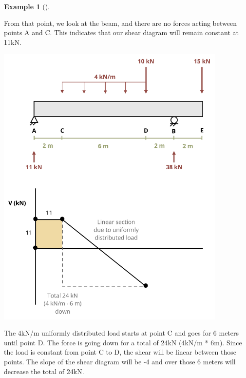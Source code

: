 \documentclass[
  letterpaper,
  DIV=11,
  numbers=noendperiod]{scrreprt}
\theoremstyle{definition}
\newtheorem{example}{Example}[chapter]
\theoremstyle{remark}
\begin{document}
\begin{tcolorbox}
\begin{example}[]
\begin{tcolorbox}
From that point, we look at the beam, and there are no forces acting
between points A and C. This indicates that our shear diagram will
remain constant at 11kN.

\begin{center}
\includegraphics[width=4.51042in,height=\textheight]{images/CH7 PNGs/example 7.3 part 4.png}
\end{center}

The 4kN/m uniformly distributed load starts at point C and goes for 6
meters until point D. The force is going down for a total of 24kN (4kN/m
* 6m). Since the load is constant from point C to D, the shear will be
linear between those points. The slope of the shear diagram will be -4
and over those 6 meters will decrease the total of 24kN.


\end{tcolorbox}
\end{example}
\end{tcolorbox}
\end{document}
